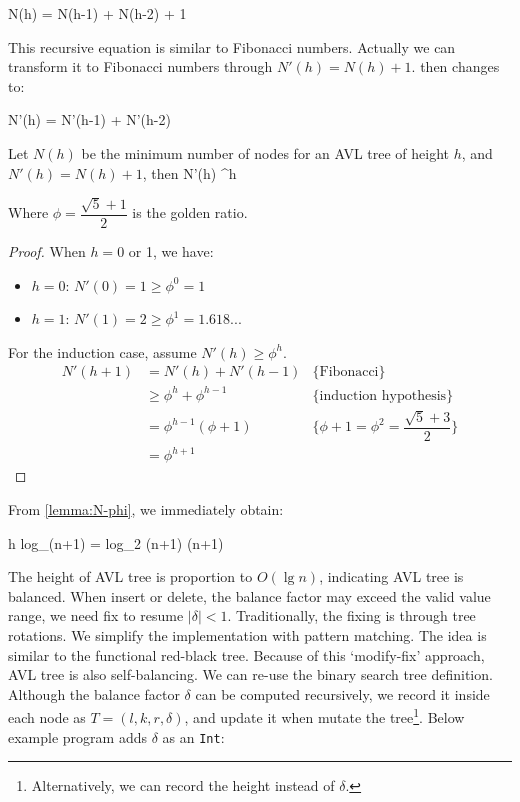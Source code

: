 \documentclass[b5paper]{article}
\begin{document}
\be
  N(h) = N(h-1) + N(h-2) + 1
  \label{eq:Fibonacci-like}
\ee

This recursive equation is similar to Fibonacci numbers. Actually we can transform it to Fibonacci numbers through $N'(h) = N(h) + 1$.  then changes to:

\be
  N'(h) = N'(h-1) + N'(h-2)
\ee

\begin{lemma}
\label{lemma:N-phi}
Let $N(h)$ be the minimum number of nodes for an AVL tree of height $h$, and $N'(h) = N(h) + 1$, then
\be
  N'(h) \geq \phi^h
\ee

Where $\phi = \dfrac{\sqrt{5}+1}{2}$ is the golden ratio.
\end{lemma}

\begin{proof}
When $h = 0$ or 1, we have:
\begin{itemize}
\item $h = 0$: $N'(0) = 1 \geq \phi^0 = 1$
\item $h = 1$: $N'(1) = 2 \geq \phi^1 = 1.618...$
\end{itemize}

For the induction case, assume $N'(h) \geq \phi^h$.
\[
  \begin{array}{rll}
  N'(h+1) & = N'(h) + N'(h-1) & \{\text{Fibonacci}\} \\
          & \geq \phi^h + \phi^{h-1} & \{\text{induction hypothesis}\}\\
          & = \phi^{h-1}(\phi + 1) & \{\phi + 1 = \phi^2 = \dfrac{\sqrt{5}+3}{2}\} \\
          & = \phi^{h+1}
 \end{array}
\]
\end{proof}

From \cref{lemma:N-phi}, we immediately obtain:

\be
  h \leq log_{\phi}(n+1) = log_{\phi}2 \cdot \lg (n+1)  \lg (n+1)
  \label{eq:AVL-height}
\ee

The height of AVL tree is proportion to $O(\lg n)$, indicating AVL tree is balanced. When insert or delete, the balance factor may exceed the valid value range, we need fix to resume $|\delta|<1$. Traditionally, the fixing is through tree rotations. We simplify the implementation with pattern matching. The idea is similar to the functional red-black tree\cite{okasaki}. Because of this `modify-fix' approach, AVL tree is also self-balancing. We can re-use the binary search tree definition. Although the balance factor $\delta$ can be computed recursively, we record it inside each node as $T = (l, k, r, \delta)$, and update it when mutate the tree\footnote{Alternatively, we can record the height instead of $\delta$\cite{py-avl}.}. Below example program adds $\delta$ as an \texttt{Int}:
\end{document}
